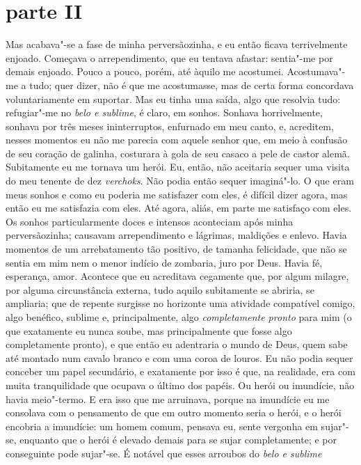 \section{parte II}

Mas acabava"-se a fase de minha perversãozinha, e eu então ficava
terrivelmente enjoado. Começava o arrependimento, que eu tentava
afastar: sentia"-me por demais enjoado. Pouco a pouco, porém, até àquilo
me acostumei. Acostumava"-me a tudo; quer dizer, não é que me
acostumasse, mas de certa forma concordava voluntariamente em suportar.
Mas eu tinha uma saída, algo que resolvia tudo: refugiar"-me no \textit{belo e
sublime}, é claro, em sonhos. Sonhava horrivelmente, sonhava por
três meses ininterruptos, enfurnado em meu canto, e, acreditem, nesses
momentos eu não me parecia com aquele senhor que, em meio à confusão de
seu coração de galinha, costurara à gola de seu casaco a pele de castor
alemã. Subitamente eu me tornava um herói. Eu, então, não aceitaria
sequer uma visita do meu tenente de dez \textit{verchoks}. Não podia
então sequer imaginá"-lo. O que eram meus sonhos e como eu poderia me
satisfazer com eles, é difícil dizer agora, mas então eu me satisfazia
com eles. Até agora, aliás, em parte me satisfaço com eles. Os sonhos
particularmente doces e intensos aconteciam após minha perversãozinha;
causavam arrependimento e lágrimas, maldições e enlevo. Havia momentos
de um arrebatamento tão positivo, de tamanha felicidade, que não se
sentia em mim nem o menor indício de zombaria, juro por Deus. Havia fé,
esperança, amor. Acontece que eu acreditava cegamente que, por algum
milagre, por alguma circunstância externa, tudo aquilo subitamente se
abriria, se ampliaria; que de repente surgisse no horizonte uma
atividade compatível comigo, algo benéfico, sublime e, principalmente,
algo \textit{completamente pronto} para mim (o que
exatamente eu nunca soube, mas principalmente que fosse algo
completamente pronto), e que então eu adentraria o mundo de Deus, quem
sabe até montado num cavalo branco e com uma coroa de louros. Eu não
podia sequer conceber um papel secundário, e exatamente por isso é que,
na realidade, era com muita tranquilidade que ocupava o último dos
papéis. Ou herói ou imundície, não havia meio"-termo. E era isso que me
arruinava, porque na imundície eu me consolava com o pensamento de que
em outro momento seria o herói, e o herói encobria a imundície: um
homem comum, pensava eu, sente vergonha em sujar"-se, enquanto que o
herói é elevado demais para se sujar completamente; e por conseguinte
pode sujar"-se. É notável que esses arroubos do \textit{belo e sublime}
